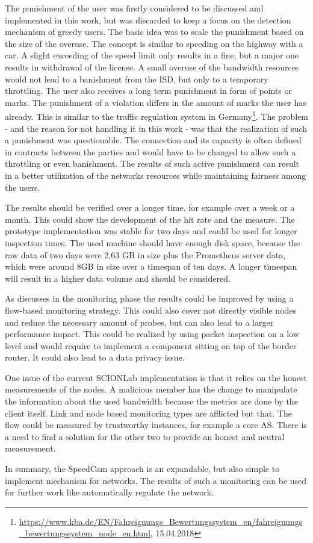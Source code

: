 \documentclass[thesis.tex]{subfiles}
\begin{document}
The punishment of the user was firstly considered to be discussed and implemented in this work, but was discarded to keep a focus on the detection mechanism of greedy users. The basic idea was to scale the punishment based on the size of the overuse. The concept is similar to speeding on the highway with a car. A slight exceeding of the speed limit only results in a fine, but a major one results in withdrawal of the license. A small overuse of the bandwidth resources would not lead to a banishment from the ISD, but only to a temporary throttling. The user also receives a long term punishment in form of points or marks. The punishment of a violation differs in the amount of marks the user has already. This is similar to the traffic regulation system in Germany\footnote{\url{https://www.kba.de/EN/Fahreignungs_Bewertungssystem_en/fahreignungs_bewertungssystem_node_en.html}, 15.04.2018}. The problem - and the reason for not handling it in this work - was that the realization of such a punishment was questionable. The connection and its capacity is often defined in contracts between the parties and would have to be changed to allow such a throttling or even banishment. The results of such active punishment can result in a better utilization of the networks resources while maintaining fairness among the users.

The results should be verified over a longer time, for example over a week or a month. This could show the development of the hit rate and the measure. The prototype implementation was stable for two days and could be used for longer inspection times. The used machine should have enough disk space, because the raw data of two days were 2,63 GB in size plus the Prometheus server data, which were around 8GB in size over a timespan of ten days. A longer timespan will result in a higher data volume and should be considered.

As discusses in the monitoring phase the results could be improved by using a flow-based monitoring strategy. This could also cover not directly visible nodes and reduce the necessary amount of probes, but can also lead to a larger performance impact. This could be realized by using packet inspection on a low level and would require to implement a component sitting on top of the border router. It could also lead to a data privacy issue.

One issue of the current SCIONLab implementation is that it relies on the honest measurements of the nodes. A malicious member has the change to manipulate the information about the used bandwidth because the metrics are done by the client itself. Link and node based monitoring types are afflicted but that. The flow could be measured by trustworthy instances, for example a core AS. There is a need to find a solution for the other two to provide an honest and neutral measurement. 

In summary, the SpeedCam approach is an expandable, but also simple to implement mechanism for networks. The results of such a monitoring can be used for further work like automatically regulate the network.

\subfilebib %
\end{document}
